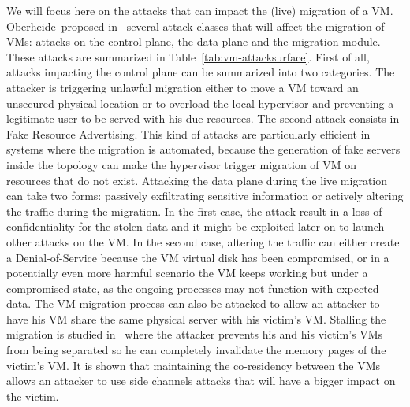 We will focus here on the attacks that can impact the (live) migration of a VM.
Oberheide~\etal proposed in~\cite{empirical-oberheide2008} several attack classes that will affect the migration of VMs: attacks on the control plane, the data plane and the migration module.
These attacks are summarized in Table~\ref{tab:vm-attacksurface}.
First of all, attacks impacting the control plane can be summarized into two categories. The attacker is triggering unlawful migration either to move a VM toward an unsecured physical location or to overload the local hypervisor and preventing a legitimate user to be served with his due resources.
The second attack consists in Fake Resource Advertising. This kind of attacks are particularly efficient in systems where the migration is automated, because the generation of fake servers inside the topology can make the hypervisor trigger migration of VM on resources that do not exist.
Attacking the data plane during the live migration can take two forms: passively exfiltrating sensitive information or actively altering the traffic during the migration.
In the first case, the attack result in a loss of confidentiality for the stolen data and it might be exploited later on to launch other attacks on the VM.
In the second case, altering the traffic can either create a Denial-of-Service because the VM virtual disk has been compromised, or in a potentially even more harmful scenario the VM keeps working but under a compromised state, as the ongoing processes may not function with expected data.
The VM migration process can also be attacked to allow an attacker to have his VM share the same physical server with his victim's VM. Stalling the migration is studied in~\cite{stalling-atya2017} where the attacker prevents his and his victim's VMs from being separated so he can completely invalidate the memory pages of the victim's VM. It is shown that maintaining the co-residency between the VMs allows an attacker to use side channels attacks that will have a bigger impact on the victim.

